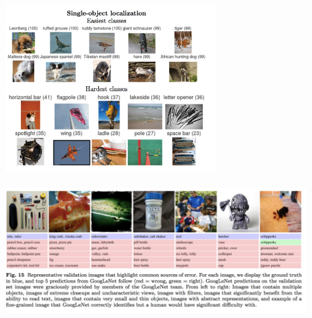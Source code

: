 \documentclass[xetex,mathserif,serif,aspectratio=169]{beamer}
\begin{document}
\begin{frame}[fragile] \frametitle{} \oldB \small

\begin{center}
\includegraphics[width=0.7\textwidth]{img/ilsvrcDifficultLocalization.jpg}
\end{center}

\end{frame}


\begin{frame}[fragile] \frametitle{} \oldB \small

\begin{center}
\includegraphics[width=\textwidth]{img/ilsvrcCommonErrors.jpg}
\end{center}

\end{frame}
\end{document}
